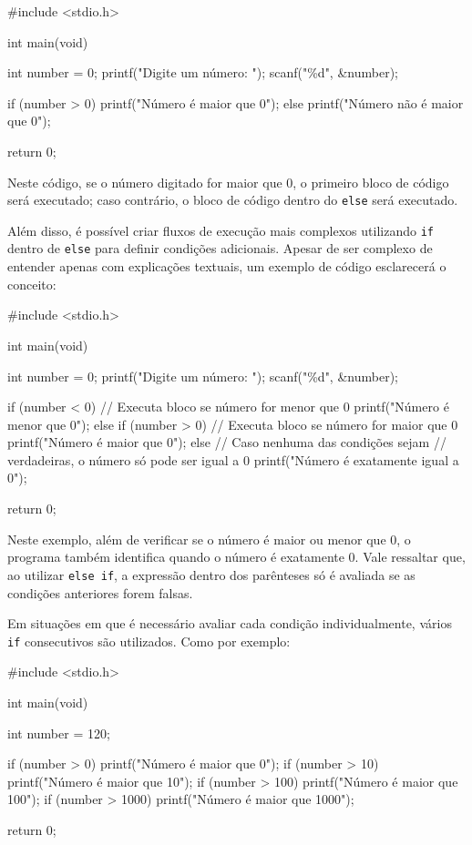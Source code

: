 \newpage
\begin{excode}
    #include <stdio.h>

    int main(void)
    {
        int number = 0;
        printf("Digite um número: ");
        scanf("\%d", &number);

        if (number > 0) {
            printf("Número é maior que 0\n");
        } else {
            printf("Número não é maior que 0\n");
        }
        
        return 0;
    }
\end{excode}

Neste código, se o número digitado for maior que \(0\), o primeiro bloco de 
código será executado; caso contrário, o bloco de código dentro do 
\texttt{else} será executado.

Além disso, é possível criar fluxos de execução mais complexos utilizando 
\texttt{if} dentro de \texttt{else} para definir condições adicionais. 
Apesar de ser complexo de entender apenas com explicações textuais, um 
exemplo de código esclarecerá o conceito:

\newpage
\begin{excode}
    #include <stdio.h>

    int main(void)
    {
        int number = 0;
        printf("Digite um número: ");
        scanf("\%d", &number);

        if (number < 0) {
            // Executa bloco se número for menor que 0
            printf("Número é menor que 0\n");
        } else if (number > 0) {
            // Executa bloco se número for maior que 0
            printf("Número é maior que 0\n");
        } else {
            // Caso nenhuma das condições sejam
            // verdadeiras, o número só pode ser igual a 0
            printf("Número é exatamente igual a 0\n");
        }
        
        return 0;
    }
\end{excode}

Neste exemplo, além de verificar se o número é maior ou menor que \(0\), o 
programa também identifica quando o número é exatamente \(0\). Vale 
ressaltar que, ao utilizar \texttt{else if}, a expressão dentro dos 
parênteses só é avaliada se as condições anteriores forem falsas.

Em situações em que é necessário avaliar cada condição individualmente, 
vários \texttt{if} consecutivos são utilizados. Como por exemplo:

\newpage
\begin{excode}
    #include <stdio.h>

    int main(void)
    {
        int number = 120;

        if (number > 0) {
            printf("Número é maior que 0\n");
        }
        if (number > 10) {
            printf("Número é maior que 10\n");
        }
        if (number > 100) {
            printf("Número é maior que 100\n");
        }
        if (number > 1000) {
            printf("Número é maior que 1000\n");
        }

        return 0;
    }
\end{excode}

